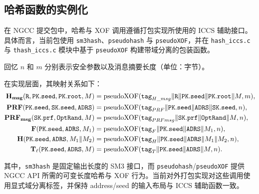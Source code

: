 \subsection{哈希函数的实例化} \label{sec:hashfunctions}

在 NGCC 提交包中，哈希与 XOF 调用遵循打包实现所使用的 ICCS 辅助接口。具体而言，当前包使用 \texttt{sm3hash}、\texttt{pseudohash} 与 \texttt{pseudoXOF}，并在 \texttt{hash\_iccs.c} 与 \texttt{thash\_iccs.c} 模块中基于 \texttt{pseudoXOF} 构建带域分离的包装函数。

回忆 $n$ 和 $m$ 分别表示安全参数以及消息摘要长度（单位：字节）。

在实现层面，其映射关系如下：
\begin{align*}
    \hashmsg (\randstr, \pk.\seed, \pk.\root, M)
        &= \mathrm{pseudoXOF}(\mathtt{tag}_{H\_msg} \| \randstr \| \pk.\seed \| \pk.\root \| M, m),\\
    \PRF(\pk.\seed, \sk.\seed, \ADRS)
        &= \mathrm{pseudoXOF}(\mathtt{tag}_{PRF} \| \pk.\seed \| \ADRS \| \sk.\seed, n),\\
    \PRFmsg(\sk.\prf, \mathtt{OptRand}, M)
        &= \mathrm{pseudoXOF}(\mathtt{tag}_{PRFmsg} \| \sk.\prf \| \mathtt{OptRand} \| M, n),\\
    \hashF(\pk.\seed, \ADRS, M_1)
        &= \mathrm{pseudoXOF}(\mathtt{tag}_{F} \| \pk.\seed \| \ADRS \| M_1, n),\\
    \hashH(\pk.\seed, \ADRS, M_1 \| M_2)
        &= \mathrm{pseudoXOF}(\mathtt{tag}_{H} \| \pk.\seed \| \ADRS \| M_1 \| M_2, n),\\
    \Th_\ell(\pk.\seed, \ADRS, M)
        &= \mathrm{pseudoXOF}(\mathtt{tag}_{T} \| \pk.\seed \| \ADRS \| M, n).
\end{align*}

其中，\texttt{sm3hash} 是固定输出长度的 SM3 接口，而 \texttt{pseudohash}/\texttt{pseudoXOF} 提供 NGCC API 所需的可变长度哈希与 XOF 行为。当前对外打包实现对这些调用使用显式域分离标签，并保持 address/seed 的输入布局与 ICCS 辅助函数一致。
